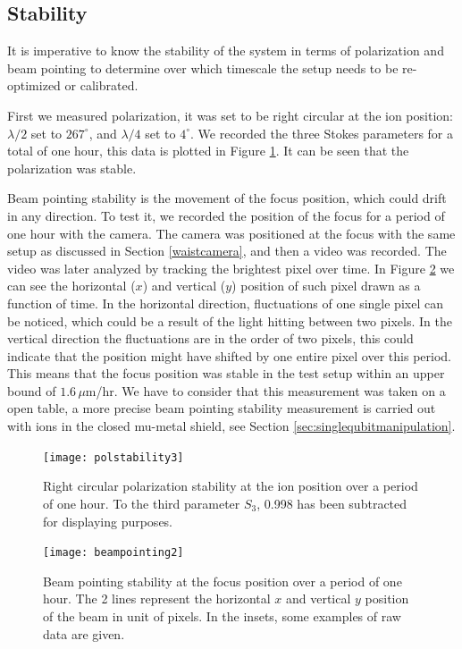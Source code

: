 \subsection{Stability}
\label{sec:stability}
It is imperative to know the stability of the system in terms of polarization and beam pointing to determine over which timescale the setup needs to be re-optimized or calibrated.\par
First we measured polarization, it was set to be right circular at the ion position: $\lambda/2$ set to $267^\circ$, and $\lambda/4$ set to $4^\circ$. We recorded the three Stokes parameters for a total of one hour, this data is plotted in Figure \ref{polstability}. It can be seen that the polarization was stable.\par %
Beam pointing stability is the movement of the focus position, which could drift in any direction. To test it, we recorded the position of the focus for a period of one hour with the camera. The camera was positioned at the focus with the same setup as discussed in Section \ref{waistcamera}, and then a video was recorded. The video was later analyzed by tracking the brightest pixel over time. In Figure \ref{beampointing} we can see the horizontal ($x$) and vertical ($y$) position of such pixel drawn as a function of time. In the horizontal direction, fluctuations of one single pixel can be noticed, which could be a result of the light hitting between two pixels. In the vertical direction the fluctuations are in the order of two pixels, this could indicate that the position might have shifted by one entire pixel over this period. This means that the focus position was stable in the test setup within an upper bound of $1.6\,\mu$m/hr. We have to consider that this measurement was taken on a open table, a more precise beam pointing stability measurement is carried out with ions in the closed mu-metal shield, see Section \ref{sec:singlequbitmanipulation}.

\begin{figure}[H]
\centering
\texttt{[image: polstability3]}
\caption{Right circular polarization stability at the ion position over a period of one hour. To the third parameter $S_3$, 0.998 has been subtracted for displaying purposes.}
\label{polstability}
\end{figure}

\begin{figure}[H]
\centering
\texttt{[image: beampointing2]}
\caption{Beam pointing stability at the focus position over a period of one hour. The 2 lines represent the horizontal $x$ and vertical $y$ position of the beam in unit of pixels. In the insets, some examples of raw data are given.}
\label{beampointing}
\end{figure}


